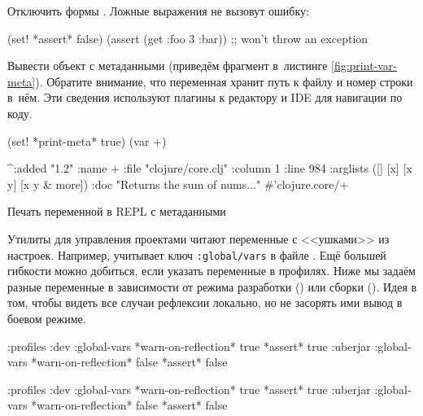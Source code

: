 \fi

Отключить формы . Ложные выражения не вызовут ошибку:

\begin{clojure}
(set! *assert* false)
(assert (get {:foo 3} :bar))
;; won't throw an exception
\end{clojure}

Вывести объект с метаданными (приведём фрагмент в~листинге
\ref{fig:print-var-meta}). Обратите внимание, что переменная хранит путь к файлу
и номер строки в~нём. Эти сведения используют плагины к редактору и IDE для
навигации по коду.

\begin{listing}[ht!]

\begin{clojure}
(set! *print-meta* true)
(var +)

^{:added "1.2"
  :name +
  :file "clojure/core.clj"
  :column 1
  :line 984
  :arglists ([] [x] [x y] [x y & more])
  :doc "Returns the sum of nums..."}
#'clojure.core/+
\end{clojure}

\caption{Печать переменной в REPL с метаданными}
\label{fig:print-var-meta}

\end{listing}


Утилиты для управления проектами читают переменные с <<ушками>> из
настроек. Например,  учитывает ключ \texttt{:global\-/vars} в файле
. Ещё большей гибкости можно добиться, если указать переменные
в профилях. Ниже мы задаём разные переменные в зависимости от режима разработки
() или сборки (). Идея в том, чтобы видеть все случаи
рефлексии локально, но не засорять ими вывод в боевом режиме.

\ifnarrow

\begin{clojure}
{:profiles
 :dev {:global-vars
       {*warn-on-reflection* true
        *assert* true}}
 :uberjar {:global-vars
           {*warn-on-reflection* false
            *assert* false}}}
\end{clojure}

\else

\begin{clojure}
{:profiles
 :dev {:global-vars {*warn-on-reflection* true
                     *assert* true}}
 :uberjar {:global-vars {*warn-on-reflection* false
                         *assert* false}}}
\end{clojure}

